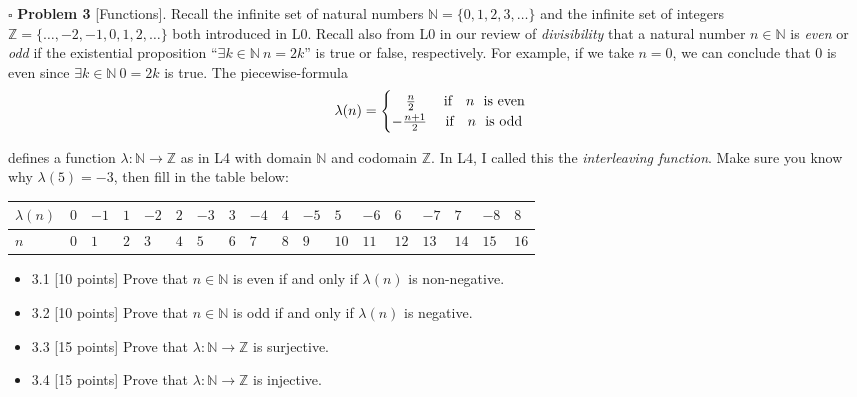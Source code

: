 \documentclass[11pt,twoside]{amsart}
\begin{document}
\newpage
  \noindent $\square$ \textbf{Problem 3} [\textsf{Functions}].  Recall the infinite set of natural numbers $\mathbb{N} = \{0,1,2,3,\ldots\}$ and the infinite set of integers $\mathbb{Z} = \{ \ldots, -2, -1,0,1,2,\ldots\}$ both introduced in \textsf{L0}.  Recall also from \textsf{L0} in our review of \textit{divisibility} that a natural number $n \in \mathbb{N}$ is \textit{even} or \textit{odd} if the existential proposition ``$\exists k \in \mathbb{N} \ n=2k$'' is true or false, respectively.  For example, if we take $n=0$, we can conclude that $0$ is even since $\exists k \in \mathbb{N} \  0=2k$ is true.  The piecewise-formula 
    $$\lambda (n) = \begin{cases}  \ \ \  \frac{n}{2} \ \ \ \ \ \ \textnormal{if} \ \ \ n \ \ \textnormal{is even} \\ - \frac{n+1}{2} \ \ \ \ \textnormal{if} \ \ \ n \ \ \textnormal{is odd} \end{cases} $$ 
    
    \noindent defines a function $\lambda: \mathbb{N} \rightarrow \mathbb{Z}$ as in \textsf{L4} with domain $\mathbb{N}$ and codomain $\mathbb{Z}$.  In \textsf{L4}, I called this the \textit{interleaving function}.  Make sure you know why $\lambda(5)= -3$, then fill in the table below:

\begin{Small}
\begin{centering}
           \begin{table}[hbt!]
\begin{tabular}{| l |  | l  | l  | l  | l  | l  | l  | l  | l  | l  | l  | l  | l  | l  | l  | l  | l  | l  | }
  \hline 
  $\lambda(n)$ & $0$ & $-1$ & $1$ & $ -2$ & $2$& $-3$ &$3$ &$-4$ & $4$ &$-5$ & $5$ & $-6$ & $6$ & $-7$ & $7$  & $-8$ & $8$\\ 
 \hline
 $n$ &  $0$ & $1$ & $2$ & $3$ & $4$ & $5$ & $6$ & $7$ & $8$ & $9$ & $10$ & $11$ & $12$ & $13$ & $14$ & $15$ & $16$  \\
 \hline
\end{tabular}
\end{table}
\end{centering}
\end{Small}

 \begin{itemize}
          \itemsep0em
          \item 3.1 [10 points] Prove that $n \in \mathbb{N}$ is even if and only if $\lambda(n)$ is non-negative.
          \item 3.2 [10 points] Prove that $n \in \mathbb{N}$ is odd if and only if $\lambda(n)$ is negative.
          \item 3.3 [15 points] Prove that $\lambda: \mathbb{N} \rightarrow \mathbb{Z}$ is surjective.
          \item 3.4 [15 points] Prove that $\lambda: \mathbb{N} \rightarrow \mathbb{Z}$ is injective.
          \end{itemize}
\end{document}
